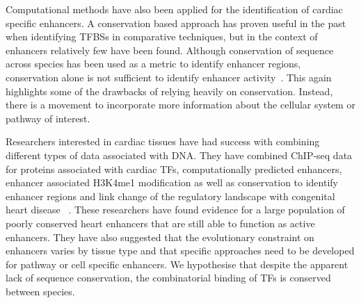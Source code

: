 Computational methods have also been applied for the identification of cardiac specific enhancers. A conservation based approach has proven useful in the past when identifying TFBSs in comparative techniques, but in the context of enhancers relatively few have been found. Although conservation of sequence across species has been used as a metric to identify enhancer regions, conservation alone is not sufficient to identify enhancer activity~\cite{blow2010chip}. This again highlights some of the drawbacks of relying heavily on conservation. Instead, there is a movement to incorporate more information about the cellular system or pathway of interest. 
 
Researchers interested in cardiac tissues have had success with combining different types of data associated with DNA. They have combined ChIP-seq data for proteins associated with cardiac TFs, computationally predicted enhancers, enhancer associated H3K4me1 modification as well as conservation to identify enhancer regions and link change of the regulatory landscape with congenital heart disease ~\cite{smemo2012regulatory}. These researchers have found evidence for a large population of poorly conserved heart enhancers that are still able to function as active enhancers. They have also suggested that the evolutionary constraint on enhancers varies by tissue type and that specific approaches need to be developed for pathway or cell specific enhancers. We hypothesise that despite the apparent lack of sequence conservation, the combinatorial binding of TFs is conserved between species. 


       


   
